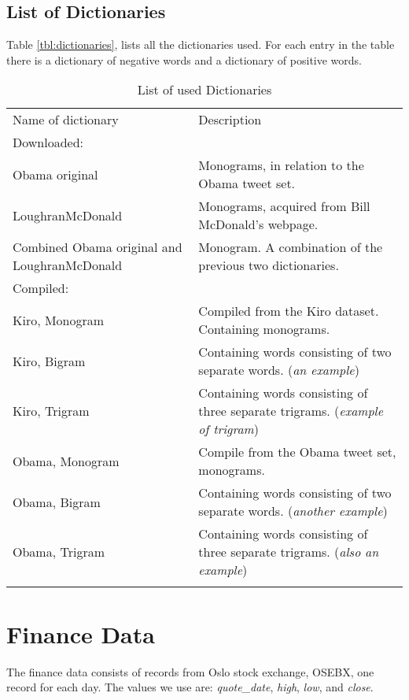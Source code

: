 \subsection{List of Dictionaries}
Table \ref{tbl:dictionaries}, lists all the dictionaries used. For each entry in
the table there is a dictionary of negative words and a dictionary of positive
words.  

\begin{table}
\centering
\label{tbl:dictionaries}
\caption{List of used Dictionaries}
\begin{tabular}{ p{5cm} p{7cm} }
Name of dictionary & Description \\
Downloaded:& \\
\hline
Obama original & Monograms, in relation to the Obama tweet set. \\
LoughranMcDonald & Monograms, acquired from Bill McDonald's webpage.\\
Combined Obama original and LoughranMcDonald & Monogram. A combination of
the previous two dictionaries. \\

Compiled:& \\
\hline
Kiro, Monogram & Compiled from the Kiro dataset. Containing
monograms. \\
Kiro, Bigram &  Containing words consisting of two separate words. (\textit{an 
example}) \\
Kiro, Trigram & Containing words consisting of three separate trigrams.
(\textit{example of trigram})\\
Obama, Monogram & Compile from the Obama tweet set, monograms. \\
Obama, Bigram & Containing words consisting of two separate words.
(\textit{another example}) \\
Obama, Trigram & Containing words consisting of three separate trigrams.
(\textit{also an example})\\

	\label{data:dictionary_list}
\end{tabular}
\end{table}
%

\section{Finance Data}\label{data:finance}
The finance data consists of records from Oslo stock exchange, OSEBX, one
record for each day. 
The values we use are: \textit{quote\_date}, \textit{high},
\textit{low}, and \textit{close}.

